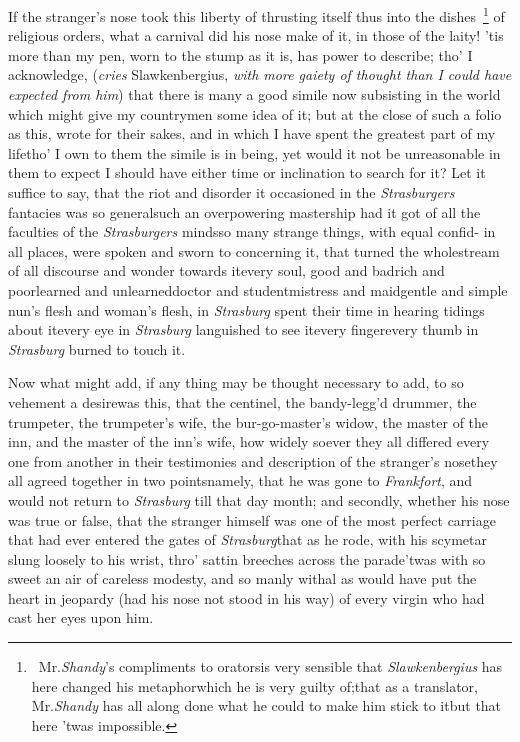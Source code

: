 \documentclass{article}
\begin{document}
If the stranger’s nose took this liberty of thrusting itself thus into
the dishes~\footnote{\ Mr.\@ \textit{Shandy}’s compliments \vrule height 12pt width 0pt
to orators\tsh is very sensible that \textit{Slawkenbergius}
has here changed his metaphor\tsk which he is very guilty
of;\tsk that as a translator, Mr.\@ \textit{Shandy} has all
along done what he could to make him stick to it\tsk but
that here ’twas impossible.}
of religious orders, \etc what a carnival did his nose make of it, in those of the
laity!\break
\tsk ’tis more than my pen, worn to the stump as it is, has power to describe;
tho’ I acknowledge, (\textit{cries} Slawkenbergius,\break
\textit{with more gaiety of
thought than I could have expected from him}) that there is many a good simile now
subsisting in the world which might give my countrymen some idea of it; but at the
close of such a folio as this, wrote for their sakes, and in which I have spent the
greatest part of my life\tsh tho’ I own to them the simile is in being, yet would it
not be unreasonable in them to expect I should have either time or inclination to
search for it? Let it suffice to say, that the riot and disorder it occasioned in
the \textit{Strasburgers} fantacies was so general\tsk such an overpowering mastership
had it got of all the faculties of the \textit{Strasburgers}
minds\tsk so
many strange things, with equal confid-\break
{}
in all places,
were spoken and sworn to concerning it, that turned the
whole\break stream of all
discourse and wonder towards it\tsk every soul, good and bad\tsk rich and poor\tsk learned
and unlearned\tsk doctor and student\tsk mistress and maid\tsk gentle and simple\tsk
nun’s flesh and wo\-man’s flesh, in \textit{Strasburg} spent their time in hearing
tidings about it\tsk every\break
eye in \textit{Strasburg} languished to see it\tsk every
finger\tsk every thumb in \textit{Strasburg} burned to touch it.


Now what might add, if any thing may be thought necessary to
add, to so vehement a desire\tsk was this, that the centinel, the
bandy-legg’d drummer, the trumpeter, the trumpeter’s
wife, the bur-go-master’s widow, the master of the inn, and the
master of the inn’s wife, how widely soever they all
differed every one from another in their testimonies and
description of the stranger’s nose\tsk they all agreed
together in two points\tsk namely, that he was gone to
\textit{Frankfort}, and would not return to
\textit{Strasburg} till that day month; and secondly,
whether his nose was true or false, that the stran\-ger
himself was one of the most perfect 
\break
{}\break
{}
carriage that had ever entered the gates of
\textit{Strasburg}\tsk that as he rode, with his scymetar slung
loosely to his wrist, thro’\break
{}
sattin breeches across the parade\tsk ’twas with
so sweet an air of careless modesty, and so manly withal\tsk
as would have put the heart in jeopardy (had his nose not
stood in his way) of every virgin who had cast her eyes upon
him.
\end{document}
